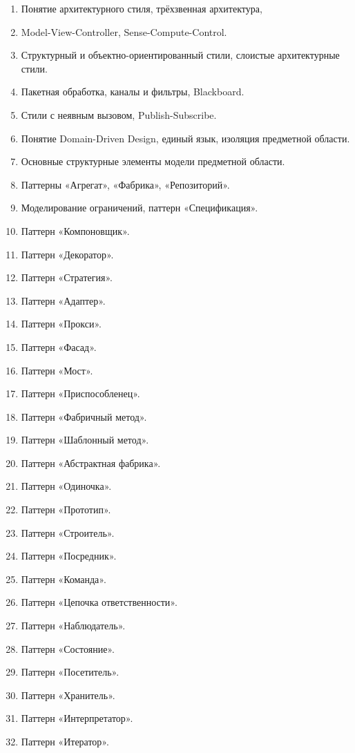 \documentclass[a5paper]{article}
\begin{document}
\begin{enumerate}
    \item Понятие архитектурного стиля, трёхзвенная архитектура, 
    \item Model-View-Controller, Sense-Compute-Control.
    \item Структурный и объектно-ориентированный стили, слоистые архитектурные стили.
    \item Пакетная обработка, каналы и фильтры, Blackboard.
    \item Стили с неявным вызовом, Publish-Subscribe.
    \item Понятие Domain-Driven Design, единый язык, изоляция предметной области.
    \item Основные структурные элементы модели предметной области.
    \item Паттерны «Агрегат», «Фабрика», «Репозиторий».
    \item Моделирование ограничений, паттерн «Спецификация».
    \item Паттерн «Компоновщик».
    \item Паттерн «Декоратор».
    \item Паттерн «Стратегия».
    \item Паттерн «Адаптер».
    \item Паттерн «Прокси».
    \item Паттерн «Фасад».
    \item Паттерн «Мост».
    \item Паттерн «Приспособленец».
    \item Паттерн «Фабричный метод».
    \item Паттерн «Шаблонный метод».
    \item Паттерн «Абстрактная фабрика».
    \item Паттерн «Одиночка».
    \item Паттерн «Прототип».
    \item Паттерн «Строитель».
    \item Паттерн «Посредник».
    \item Паттерн «Команда».
    \item Паттерн «Цепочка ответственности».
    \item Паттерн «Наблюдатель».
    \item Паттерн «Состояние».
    \item Паттерн «Посетитель».
    \item Паттерн «Хранитель».
    \item Паттерн «Интерпретатор».
    \item Паттерн «Итератор».

\end{enumerate}
\end{document}
